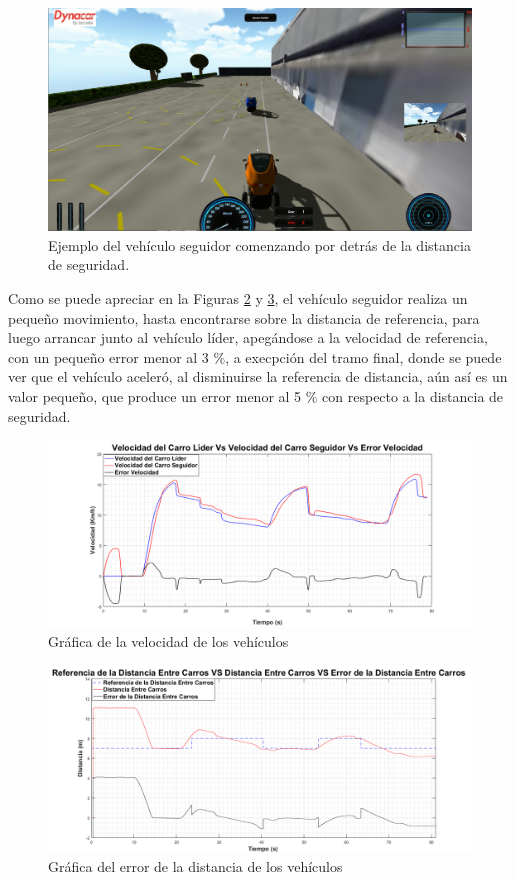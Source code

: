 \begin{figure}[H]
	\centering
		\includegraphics[scale=0.35]{Imagenes/accej}
		\caption{Ejemplo del vehículo seguidor comenzando por detrás de la distancia de seguridad.}
		\label{fig:accej}
\end{figure}	

\par Como se puede apreciar en la Figuras \ref{fig:velacc} y \ref{fig:disacc}, el vehículo seguidor realiza un pequeño movimiento, hasta encontrarse sobre la distancia de referencia, para luego arrancar junto al vehículo líder, apegándose a la velocidad de referencia, con un pequeño error menor al 3 \%, a execpción del tramo final, donde se puede ver que el vehículo aceleró, al disminuirse la referencia de distancia, aún así es un valor pequeño, que produce un error menor al 5 \% con respecto a la distancia de seguridad.\\
\begin{figure}[H]
	\centering
		\includegraphics[scale=0.35]{Imagenes/velacc}
		\caption{Gráfica de la velocidad de los vehículos}
		\label{fig:velacc}
\end{figure}	

\begin{figure}[H]
	\centering
		\includegraphics[scale=0.35]{Imagenes/disacc}
		\caption{Gráfica del error de la distancia de los vehículos}
		\label{fig:disacc}
\end{figure}	

